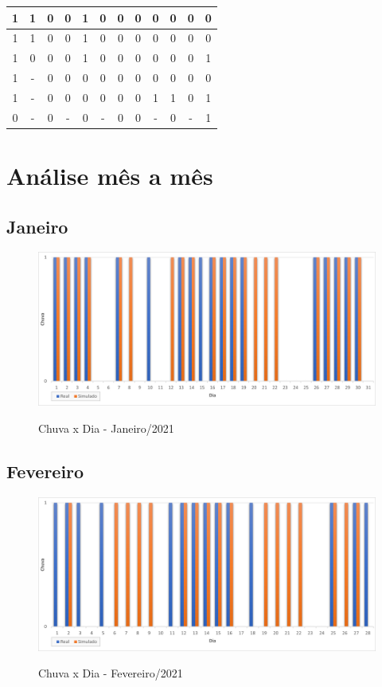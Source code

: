 \begin{table}[H]
\begin{tabular}{|c|c|c|c|c|c|c|c|c|c|c|c|}
1 & 1 & 0 & 0 & 1 & 0 & 0 & 0 & 0 & 0 & 0 & 0 \\ \hline
1 & 1 & 0 & 0 & 1 & 0 & 0 & 0 & 0 & 0 & 0 & 0 \\ \hline
1 & 0 & 0 & 0 & 1 & 0 & 0 & 0 & 0 & 0 & 0 & 1 \\ \hline
1 & - & 0 & 0 & 0 & 0 & 0 & 0 & 0 & 0 & 0 & 0 \\ \hline
1 & - & 0 & 0 & 0 & 0 & 0 & 0 & 1 & 1 & 0 & 1 \\ \hline
0 & - & 0 & - & 0 & - & 0 & 0 & - & 0 & - & 1 \\ \hline
\end{tabular}
\vspace*{15px}
\end{table}

\section{Análise mês a mês}

\subsection{Janeiro}
\begin{figure}[H]
	\caption{\small Chuva x Dia - Janeiro/2021}
	\centering
	\includegraphics[width=\textwidth]{figs/jan.png}
	\label{f.rjan}
\end{figure}

\subsection{Fevereiro}
\begin{figure}[H]
	\caption{\small Chuva x Dia - Fevereiro/2021}
	\centering
	\includegraphics[width=\textwidth]{figs/fev.png}
	\label{f.rfev}
\end{figure}

